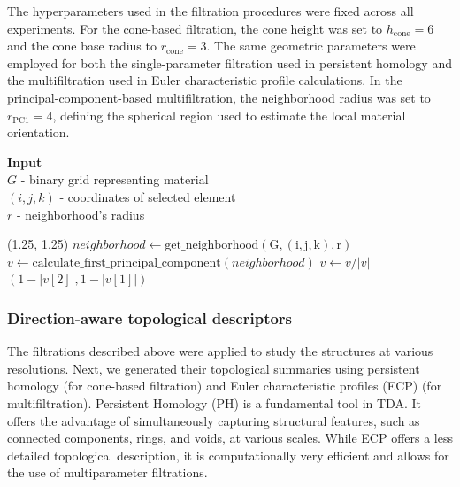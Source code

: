 \documentclass[sn-mathphys,Numbered]{sn-jnl}
\theoremstyle{definition}
\begin{document}
The hyperparameters used in the filtration procedures were fixed across all experiments. For the cone-based filtration, the cone height was set to $h_{\mathrm{cone}} = 6$ and the cone base radius to $r_{\mathrm{cone}} = 3$. The same geometric parameters were employed for both the single-parameter filtration used in persistent homology and the multifiltration used in Euler characteristic profile calculations. In the principal-component-based multifiltration, the neighborhood radius was set to $r_{\mathrm{PC1}} = 4$, defining the spherical region used to estimate the local material orientation.



\begin{algorithm}
\caption{An algorithm of computing principal component-based multifiltration}\label{alg:cap}
\textbf{Input} \\
  \hspace*{\algorithmicindent}  $G$ - binary grid representing material \\
  \hspace*{\algorithmicindent}  $(i, j, k)$ - coordinates of selected element \\
  \hspace*{\algorithmicindent}  $r$ - neighborhood's radius
\begin{algorithmic}
    \State \Return (1.25, 1.25)
\Else
    \State $neighborhood \gets \mathrm{get\_neighborhood(G, (i,j,k), r)}$
    \State $v \gets \mathrm{calculate\_first\_principal\_component}(neighborhood)$
    \State $v \gets v / |v|$ 
    \State \Return $(1 - |v[2]|, 1 - |v[1]|)$
\EndIf
\EndProcedure
\end{algorithmic}
\end{algorithm}


\subsubsection{Direction-aware topological descriptors}

The filtrations described above were applied to study the structures at various resolutions. Next, we generated their topological summaries using persistent homology (for cone-based filtration) and Euler characteristic profiles (ECP) (for multifiltration). Persistent Homology (PH) is a fundamental tool in TDA. It offers the advantage of simultaneously capturing structural features, such as connected components, rings, and voids, at various scales. While ECP offers a less detailed topological description, it is computationally very efficient and allows for the use of multiparameter filtrations.
\end{document}
